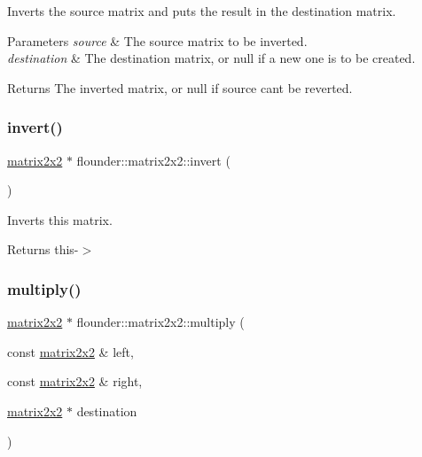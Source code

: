 Inverts the source matrix and puts the result in the destination matrix. 


\begin{DoxyParams}{Parameters}
{\em source} & The source matrix to be inverted. \\
\hline
{\em destination} & The destination matrix, or null if a new one is to be created. \\
\hline
\end{DoxyParams}
\begin{DoxyReturn}{Returns}
The inverted matrix, or null if source can\textquotesingle{}t be reverted. 
\end{DoxyReturn}
\mbox{\label{classflounder_1_1matrix2x2_a88dc423971ee40b21df08f8ae5b03d43}} 
\subsubsection{\texorpdfstring{invert()}{invert()}\hspace{0.1cm}{\footnotesize\ttfamily [2/2]}}
{\footnotesize\ttfamily \hyperlink{classflounder_1_1matrix2x2}{matrix2x2} $\ast$ flounder\+::matrix2x2\+::invert (\begin{DoxyParamCaption}{ }\end{DoxyParamCaption})}



Inverts this matrix. 

\begin{DoxyReturn}{Returns}
this-\/$>$ 
\end{DoxyReturn}
\mbox{\label{classflounder_1_1matrix2x2_ab038a15b43141ba85b9779ba3c772579}} 
\subsubsection{\texorpdfstring{multiply()}{multiply()}}
{\footnotesize\ttfamily \hyperlink{classflounder_1_1matrix2x2}{matrix2x2} $\ast$ flounder\+::matrix2x2\+::multiply (\begin{DoxyParamCaption}\item[{const \hyperlink{classflounder_1_1matrix2x2}{matrix2x2} \&}]{left,  }\item[{const \hyperlink{classflounder_1_1matrix2x2}{matrix2x2} \&}]{right,  }\item[{\hyperlink{classflounder_1_1matrix2x2}{matrix2x2} $\ast$}]{destination }\end{DoxyParamCaption})\hspace{0.3cm}{\ttfamily [static]}}



